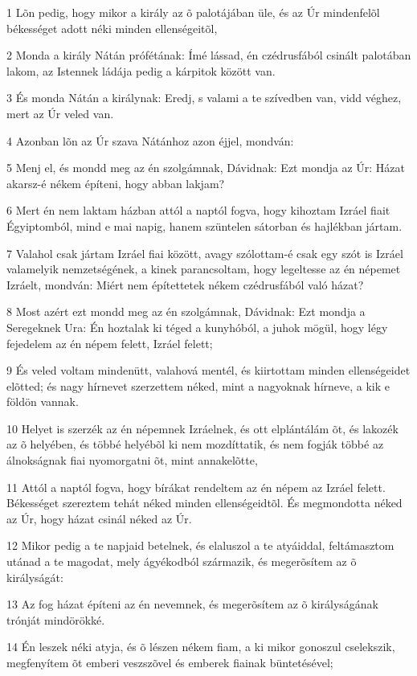 \par 1 Lõn pedig, hogy mikor a király az õ palotájában üle, és az Úr mindenfelõl békességet adott néki minden ellenségeitõl,
\par 2 Monda a király Nátán prófétának: Ímé lássad, én czédrusfából csinált palotában  lakom, az Istennek ládája pedig a kárpitok között van.
\par 3 És monda Nátán a királynak: Eredj, s valami a te szívedben van, vidd véghez, mert az Úr veled van.
\par 4 Azonban lõn az Úr szava Nátánhoz azon éjjel, mondván:
\par 5 Menj el, és mondd meg az én szolgámnak, Dávidnak: Ezt mondja az Úr: Házat akarsz-é nékem építeni, hogy abban lakjam?
\par 6 Mert én nem laktam házban attól a naptól fogva, hogy kihoztam Izráel fiait Égyiptomból, mind e mai napig, hanem szüntelen sátorban és hajlékban jártam.
\par 7 Valahol csak jártam Izráel fiai között, avagy szólottam-é csak egy szót is Izráel valamelyik nemzetségének, a kinek parancsoltam, hogy legeltesse az én népemet Izráelt, mondván: Miért nem építettetek nékem czédrusfából való házat?
\par 8 Most azért ezt mondd meg az én szolgámnak, Dávidnak: Ezt mondja a Seregeknek Ura: Én hoztalak ki téged a kunyhóból, a juhok mögül, hogy légy fejedelem az én népem felett, Izráel felett;
\par 9 És veled voltam mindenütt, valahová mentél, és kiirtottam minden ellenségeidet elõtted; és nagy hírnevet szerzettem néked, mint a nagyoknak hírneve, a kik e földön vannak.
\par 10 Helyet is szerzék az én népemnek Izráelnek, és ott elplántálám õt, és lakozék az õ helyében, és többé helyébõl ki nem mozdíttatik, és nem fogják többé az álnokságnak fiai nyomorgatni õt, mint  annakelõtte,
\par 11 Attól a naptól fogva, hogy bírákat rendeltem az én népem az Izráel felett. Békességet szereztem tehát néked minden ellenségeidtõl. És megmondotta néked az Úr, hogy házat csinál néked az  Úr.
\par 12 Mikor pedig a te napjaid betelnek, és elaluszol a te atyáiddal, feltámasztom utánad a te magodat, mely ágyékodból származik, és megerõsítem az õ királyságát:
\par 13 Az fog házat építeni az én nevemnek, és megerõsítem az õ királyságának trónját mindörökké.
\par 14 Én leszek néki atyja, és õ lészen nékem fiam, a ki mikor gonoszul cselekszik, megfenyítem õt  emberi veszszõvel és emberek fiainak büntetésével;
